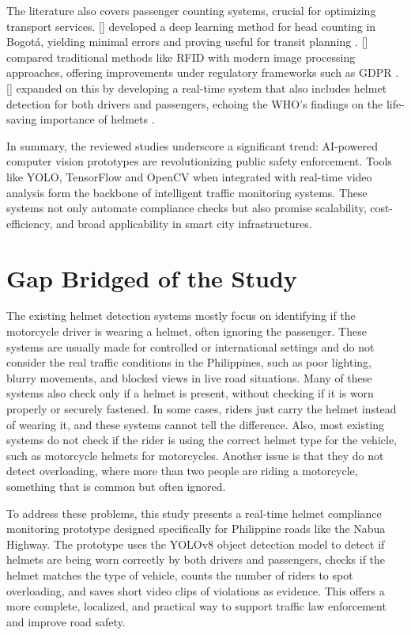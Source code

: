 \begin{refsection}
The literature also covers passenger counting systems, crucial for optimizing transport services. \citeauthor{rendon2023passenger} [\citeyear{rendon2023passenger}] developed a deep learning method for head counting in Bogotá, yielding minimal errors and proving useful for transit planning \cite{rendon2023passenger}. \citeauthor{radovan2024passenger} [\citeyear{radovan2024passenger}] compared traditional methods like RFID with modern image processing approaches, offering improvements under regulatory frameworks such as GDPR \cite{radovan2024passenger}. \citeauthor{bhatt2024ai} [\citeyear{bhatt2024ai}] expanded on this by developing a real-time system that also includes helmet detection for both drivers and passengers, echoing the WHO’s findings on the life-saving importance of helmets \cite{bhatt2024ai}.


In summary, the reviewed studies underscore a significant trend: AI-powered computer vision prototypes are revolutionizing public safety enforcement. Tools like YOLO, TensorFlow and OpenCV when integrated with real-time video analysis form the backbone of intelligent traffic monitoring systems. These systems not only automate compliance checks but also promise scalability, cost-efficiency, and broad applicability in smart city infrastructures.


\section{Gap Bridged of the Study}
 The existing helmet detection systems mostly focus on identifying if the motorcycle driver is wearing a helmet, often ignoring the passenger. These systems are usually made for controlled or international settings and do not consider the real traffic conditions in the Philippines, such as poor lighting, blurry movements, and blocked views in live road situations. Many of these systems also check only if a helmet is present, without checking if it is worn properly or securely fastened. In some cases, riders just carry the helmet instead of wearing it, and these systems cannot tell the difference. Also, most existing systems do not check if the rider is using the correct helmet type for the vehicle, such as motorcycle helmets for motorcycles. Another issue is that they do not detect overloading, where more than two people are riding a motorcycle, something that is common but often ignored.


 To address these problems, this study presents a real-time helmet compliance monitoring prototype designed specifically for Philippine roads like the Nabua Highway. The prototype uses the YOLOv8 object detection model to detect if helmets are being worn correctly by both drivers and passengers, checks if the helmet matches the type of vehicle, counts the number of riders to spot overloading, and saves short video clips of violations as evidence. This offers a more complete, localized, and practical way to support traffic law enforcement and improve road safety.






\clearpage


\printbibliography[heading=subbibintoc, title={\texorpdfstring{\centering}{} Notes}]
\end{refsection}
